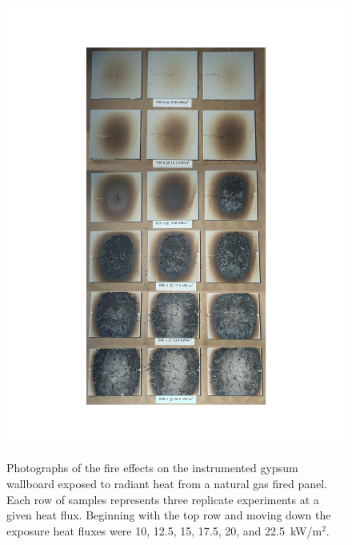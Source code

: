 \documentclass[twoside]{uocthesis}
\begin{document}
{\begin{figure}[p]
	\centering
	\includegraphics[width=\textwidth]{../Figures/RPGB_SET} \\
	\caption[Photographs of the fire effects on the instrumented gypsum wallboard exposed to radiant heat from a natural gas fired panel.  ]{Photographs of the fire effects on the instrumented gypsum wallboard exposed to radiant heat from a natural gas fired panel.  Each row of samples represents three replicate experiments at a given heat flux. Beginning with the top row and moving down the exposure heat fluxes were 10, 12.5, 15, 17.5, 20, and 22.5~kW/m$^2$.}
	\label{RPGB_SET}
\end{figure}

}
\end{document}
